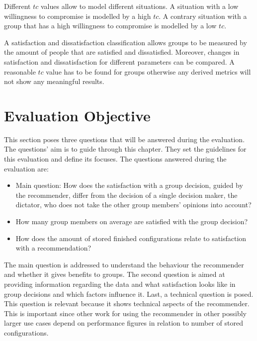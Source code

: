 
Different $tc$ values allow to model different situations. A situation with a low willingness to compromise is modelled by a high $tc$. A contrary situation with a group that has a high willingness to compromise is modelled by a low $tc$.

A satisfaction and dissatisfaction classification allows groups to be measured by the amount of people that are satisfied and dissatisfied. Moreover, changes in satisfaction and dissatisfaction for different parameters can be compared. A reasonable $tc$ value has to be found for groups otherwise any derived metrics will not show any meaningful results.

\section{Evaluation Objective}
\label{sec:Evaluation:Questions}

This section poses three questions that will be answered during the evaluation. The questions' aim is to guide through this chapter. They set the guidelines for this evaluation and define its focuses. The questions answered during the evaluation are:

\begin{itemize}
    \item Main question: How does the satisfaction with a group decision, guided by the recommender, differ from the decision of a single decision maker, the dictator, who does not take the other group members' opinions into account?
    \item How many group members on average are satisfied with the group decision?
    \item How does the amount of stored finished configurations relate to satisfaction with a recommendation?
\end{itemize}

The main question is addressed to understand the behaviour the recommender and whether it gives benefits to groups. The second question is aimed at providing information regarding the data and what satisfaction looks like in group decisions and which factors influence it. Last, a technical question is posed. This question is relevant because it shows technical aspects of the recommender. This is important since other work for using the recommender in other possibly larger use cases depend on performance figures in relation to number of stored configurations.


